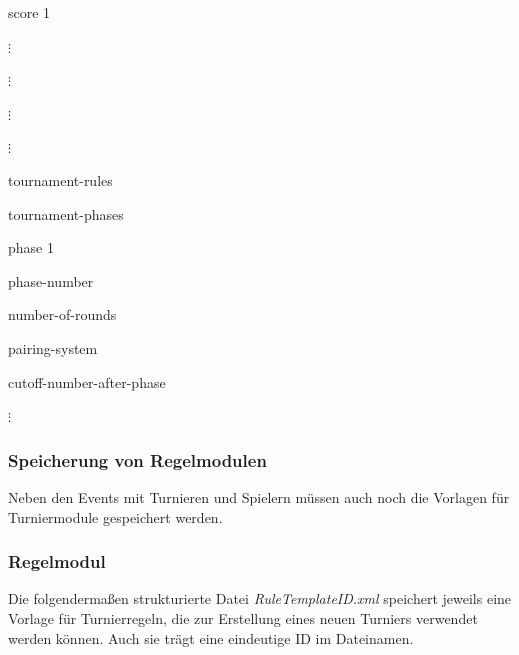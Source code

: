 \documentclass[11pt]{article}
\newcommand{\umlbullet}[1] {
	\raisebox{0.5ex}{
	\begin{tikzpicture}[#1]
		\draw (1ex,0.4ex) -- (1ex,1.3ex);
		\draw (1ex,0.4ex) -- (2ex,0.4ex);
	\end{tikzpicture}}
}
\begin{document}
{{\begin{umlscheme}
\begin{umlscheme}
\begin{umlscheme}
\begin{umlscheme}
\begin{umlscheme}
\begin{umlscheme}
						\vspace{0.1cm}
						\item[] \hspace{0.4cm} \umlbullet{} score 1
						\item[] \hspace{0.6cm} $\vdots$
						\item[] $\vdots$
					\end{umlscheme}
				\end{umlscheme}
				\item[] $\vdots$
			\end{umlscheme}
		\end{umlscheme}
		\item[] $\vdots$
	\end{umlscheme}
	\item tournament-rules
	\begin{umlscheme}
		\item tournament-phases
		\begin{umlscheme}
			\item phase 1
			\begin{umlscheme}
				\item phase-number
				\item number-of-rounds
				\item pairing-system
				\item cutoff-number-after-phase
			\end{umlscheme}
			\item[] $\vdots$
		\end{umlscheme}
	\end{umlscheme}
\end{umlscheme}}}

\subsubsection{Speicherung von Regelmodulen}

Neben den Events mit Turnieren und Spielern müssen auch noch die Vorlagen für Turniermodule gespeichert werden.

\subsubsection{Regelmodul}

Die folgendermaßen strukturierte Datei \textit{RuleTemplateID.xml} speichert jeweils eine Vorlage für Turnierregeln, die zur Erstellung eines neuen Turniers verwendet werden können. Auch sie trägt eine eindeutige ID im Dateinamen.
\vspace{0.4cm}
\end{document}
